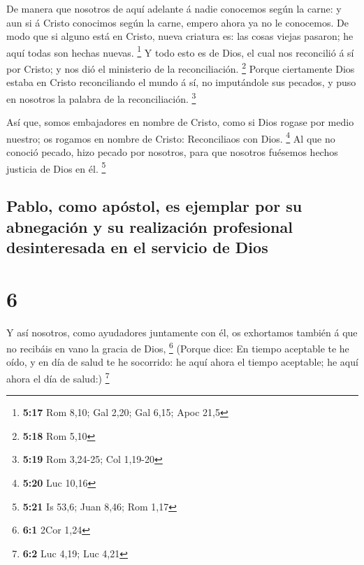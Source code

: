 De manera que nosotros de aquí adelante á nadie
conocemos según la carne: y aun si á Cristo conocimos según la carne,
empero ahora ya no le conocemos.  De modo que si alguno
está en Cristo, nueva criatura es: las cosas viejas pasaron; he aquí
todas son hechas nuevas. \footnote{\textbf{5:17} Rom 8,10; Gal 2,20; Gal
  6,15; Apoc 21,5}  Y todo esto es de Dios, el cual nos
reconcilió á sí por Cristo; y nos dió el ministerio de la
reconciliación. \footnote{\textbf{5:18} Rom 5,10}  Porque
ciertamente Dios estaba en Cristo reconciliando el mundo á sí, no
imputándole sus pecados, y puso en nosotros la palabra de la
reconciliación. \footnote{\textbf{5:19} Rom 3,24-25; Col 1,19-20}

 Así que, somos embajadores en nombre de Cristo, como si
Dios rogase por medio nuestro; os rogamos en nombre de Cristo:
Reconciliaos con Dios. \footnote{\textbf{5:20} Luc 10,16}
 Al que no conoció pecado, hizo pecado por nosotros, para
que nosotros fuésemos hechos justicia de Dios en él. \footnote{\textbf{5:21}
  Is 53,6; Juan 8,46; Rom 1,17}

\hypertarget{pablo-como-apuxf3stol-es-ejemplar-por-su-abnegaciuxf3n-y-su-realizaciuxf3n-profesional-desinteresada-en-el-servicio-de-dios}{%
\subsection{Pablo, como apóstol, es ejemplar por su abnegación y su
realización profesional desinteresada en el servicio de
Dios}\label{pablo-como-apuxf3stol-es-ejemplar-por-su-abnegaciuxf3n-y-su-realizaciuxf3n-profesional-desinteresada-en-el-servicio-de-dios}}

\hypertarget{section-5}{%
\section{6}\label{section-5}}

 Y así nosotros, como ayudadores juntamente con él, os
exhortamos también á que no recibáis en vano la gracia de Dios,
\footnote{\textbf{6:1} 2Cor 1,24}  (Porque dice: En tiempo
aceptable te he oído, y en día de salud te he socorrido: he aquí ahora
el tiempo aceptable; he aquí ahora el día de salud:) \footnote{\textbf{6:2}
  Luc 4,19; Luc 4,21}

